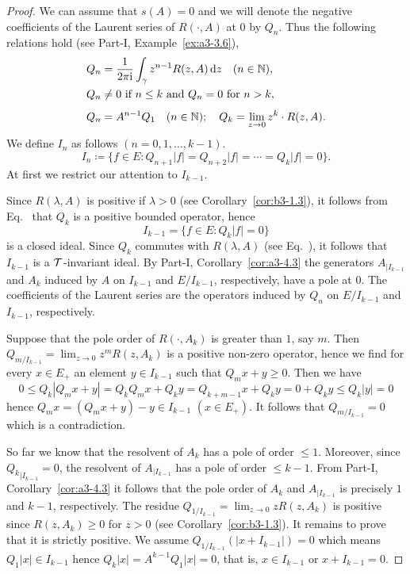 \begin{proof}
	We can assume that $s(A) = 0$ and we will denote the negative coefficients of the Laurent series of\/ $R(\cdot,A)$ at $0$ by $Q_{n}$.
	Thus the following relations hold (see Part-I, Example~\ref{ex:a3-3.6}),
	\begin{equation}\label{eq:b3-2.17}
	\begin{split}
		Q_{n} &= \frac{1}{2\pi\im}\int_{\gamma} z^{n-1}R(z,A)  \diff{z} \quad (n \in \N) ,  \\
		Q_{n} &\neq 0 \text{ if } n \leq k \text{ and } Q_{n} = 0 \text{ for } n > k ,  \\
		\rule{0ex}{3ex} Q_{n} &= A^{n-1}Q_{1} \quad (n \in \N); \quad Q_{k} = \lim_{z \to 0}z^{k}\cdot R(z,A).
	\end{split}
	\end{equation}
	We define $I_{n}$ as follows $(n = 0,1,\ldots,k-1)$.
	\[
	I_{n} \coloneq \{f \in E \colon Q_{n+1}|f| = Q_{n+2}|f| = \cdots = Q_{k}|f| = 0\}.
	\]
	At first we restrict our attention to $I_{k-1}$.
	
	Since $R(\lambda,A)$ is positive if\/ $\lambda > 0$ (see Corollary~\ref{cor:b3-1.3}), it follows from Eq.~ that $Q_{k}$ is a positive bounded operator, hence 
    \[
    I_{k-1} = \{f \in E \colon Q_{k}|f| = 0\}
    \]
    is a closed ideal.
	Since $Q_{k}$ commutes with $R(\lambda,A)$ (see Eq.~), it follows that $I_{k-1}$ is a $\mathcal{T}$-invariant ideal.
	By Part-I, Corollary~\ref{cor:a3-4.3} the generators $A_{|I_{k-1}}$ and $A_{k}$ induced by $A$ on $I_{k-1}$ and $E/I_{k-1}$, respectively, have a pole at $0$.
	The coefficients of the Laurent series are the operators induced by $Q_{n}$ on $E/I_{k-1}$ and $I_{k-1}$, respectively.
	
	Suppose that the pole order of\/ $R(\cdot,A_{k})$ is greater than $1$, say $m$.
	Then $Q_{m/I_{k-1}} = \lim_{z \to 0}z^{m}R(z,A_{k})$ is a positive non-zero operator, hence we find for every $x \in E_{+}$ an element $y \in I_{k-1}$ such that $Q_{m}x + y \geq 0$.
	Then we have
	\[
	0 \leq Q_{k}|Q_{m}x + y| = Q_{k}Q_{m}x + Q_{k}y = Q_{k+m-1}x + Q_{k}y = 0 + Q_{k}y \leq Q_{k}|y| = 0
	\]
	hence $Q_{m}x = (Q_{m}x + y) - y \in I_{k-1}$ $(x \in E_{+})$.
	It follows that $Q_{m/I_{k-1}} = 0$ which is a contradiction.
	
	So far we know that the resolvent of\/ $A_{k}$ has a pole of order $\leq 1$.
	Moreover, since ${Q_{k}}_{|I_{k-1}} = 0$, 
	the resolvent of\/ $A_{|I_{k-1}}$ has a pole of order $\leq k-1$.
	From Part-I, Corollary~\ref{cor:a3-4.3} it follows that the pole order of\/ $A_{k}$ and $A_{|I_{k-1}}$ is precisely $1$ and $k-1$, respectively.
	The residue $Q_{1/I_{k-1}} = \lim_{z \to 0}zR(z,A_{k})$ is positive since $R(z,A_{k}) \geq 0$ for $z > 0$ (see Corollary~\ref{cor:b3-1.3}).
	It remains to prove that it is strictly positive. We assume $Q_{1/I_{k-1}}(|x + I_{k-1}|) = 0$ which means $Q_{1}|x| \in I_{k-1}$ hence $Q_{k}|x| = A^{k-1}Q_{1}|x| = 0$, that is, $x \in I_{k-1}$ or $x + I_{k-1} = 0$.
	

\end{proof}

